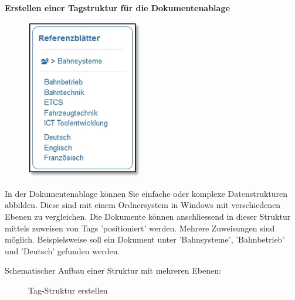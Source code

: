 \textbf{Erstellen einer Tagstruktur für die Dokumentenablage}

\vspace{\baselineskip}

\begin{figure}
\vspace{-30pt}
\includegraphics[height=70mm]{../chapters/13_Konfigurationen/pictures/DokTagStruktur.jpg}
\end{figure}

In der Dokumentenablage können Sie einfache oder komplexe Datenstrukturen abbilden. Diese sind mit einem Ordnersystem in Windows mit verschiedenen Ebenen zu vergleichen. Die Dokumente können anschliessend in dieser Struktur mittels zuweisen von Tags 'positioniert' werden. Mehrere Zuweisungen sind möglich. Beispielsweise soll ein Dokument unter 'Bahnsysteme', 'Bahnbetrieb' und 'Deutsch' gefunden werden.

\vspace{3cm} 

Schematischer Aufbau einer Struktur mit mehreren Ebenen:

\begin{figure}[H]
\caption{Tag-Struktur erstellen}
\end{figure}

